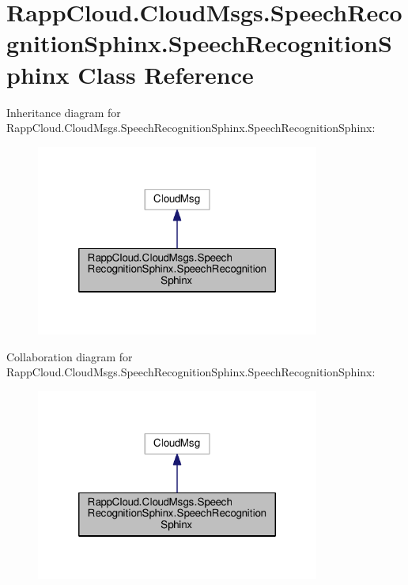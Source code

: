 \hypertarget{classRappCloud_1_1CloudMsgs_1_1SpeechRecognitionSphinx_1_1SpeechRecognitionSphinx}{\section{Rapp\-Cloud.\-Cloud\-Msgs.\-Speech\-Recognition\-Sphinx.\-Speech\-Recognition\-Sphinx Class Reference}
\label{classRappCloud_1_1CloudMsgs_1_1SpeechRecognitionSphinx_1_1SpeechRecognitionSphinx}
}


Inheritance diagram for Rapp\-Cloud.\-Cloud\-Msgs.\-Speech\-Recognition\-Sphinx.\-Speech\-Recognition\-Sphinx\-:
\nopagebreak
\begin{figure}[H]
\begin{center}
\leavevmode
\includegraphics[width=264pt]{classRappCloud_1_1CloudMsgs_1_1SpeechRecognitionSphinx_1_1SpeechRecognitionSphinx__inherit__graph}
\end{center}
\end{figure}


Collaboration diagram for Rapp\-Cloud.\-Cloud\-Msgs.\-Speech\-Recognition\-Sphinx.\-Speech\-Recognition\-Sphinx\-:
\nopagebreak
\begin{figure}[H]
\begin{center}
\leavevmode
\includegraphics[width=264pt]{classRappCloud_1_1CloudMsgs_1_1SpeechRecognitionSphinx_1_1SpeechRecognitionSphinx__coll__graph}
\end{center}
\end{figure}

